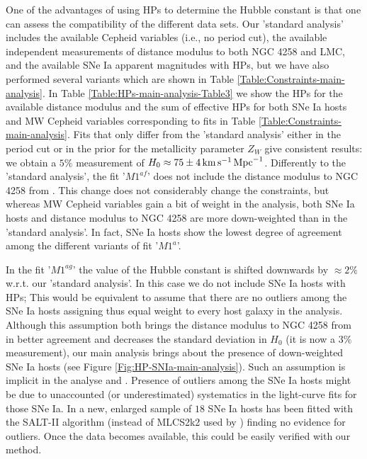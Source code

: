 One of the advantages of using HPs to determine the Hubble constant is that one can assess the compatibility of the different data sets. Our 'standard analysis' includes the available Cepheid variables (i.e., no period cut), the available independent measurements of distance modulus to both NGC 4258 and LMC, and the available SNe Ia apparent magnitudes with HPs, but we have also performed several variants which are shown in Table \ref{Table:Constraints-main-analysis}. In Table \ref{Table:HPs-main-analysis-Table3} we show the HPs for the available distance modulus and the sum of effective HPs for both SNe Ia hosts and MW Cepheid variables corresponding to fits in Table \ref{Table:Constraints-main-analysis}. Fits that only differ from the 'standard analysis' either in the period cut or in the prior for the metallicity parameter $Z_W$ give consistent results: we obtain a $5\%$ measurement of $H_0 \approx 75 \pm 4\, \mathrm{km}\, \mathrm{s}^{-1}\, \mathrm{Mpc}^{-1}$. Differently to the 'standard analysis', the fit '$M1^{af}$' does not include the distance modulus to NGC 4258 from \cite{Polshaw:2015ika}. This change does not considerably change the constraints, but whereas MW Cepheid variables gain a bit of weight in the analysis, both SNe Ia hosts and distance modulus to NGC 4258 are more down-weighted than in the 'standard analysis'. In fact, SNe Ia hosts show the lowest degree of agreement among the different variants of fit '$M1^a$'.

In the fit '$M1^{ag}$' the value of the Hubble constant is shifted downwards by $\approx 2\%$ w.r.t. our 'standard analysis'. In this case we do not include SNe Ia hosts with HPs; This would be equivalent to assume that there are no outliers among the SNe Ia hosts assigning thus equal weight to every host galaxy in the analysis. Although this assumption both brings the distance modulus to NGC 4258 from \cite{Humphreys:2013eja} in better agreement and decreases the standard deviation in $H_0$ (it is now a $3\%$ measurement), our main analysis brings about the presence of down-weighted SNe Ia hosts (see Figure \ref{Fig:HP-SNIa-main-analysis}). Such an assumption is implicit in the analyse \cite{Riess:2011yx} and \cite{Efstathiou:2013via}. Presence of outliers among the SNe Ia hosts might be due to unaccounted (or underestimated) systematics in the light-curve fits for those SNe Ia. In \cite{Riess:2016jrr} a new, enlarged sample of $18$ SNe Ia hosts has been fitted with the SALT-II algorithm (instead of MLCS2k2 used by \cite{Riess:2011yx}) finding no evidence for outliers. Once the data becomes available, this could be easily verified with our method.

